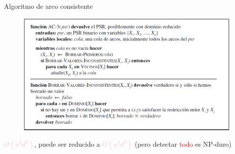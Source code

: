 \begin{frame}{Algoritmo de arco consistente}
    \begin{figure}[t]
        \includegraphics[scale = 0.2]{5_codigopsr.png}
    \end{figure}
\textcolor{pink}{$O(n^2d^3)$}, puede ser reducido a \textcolor{pink}{$O(n^2d^2)$} (pero detectar \textcolor{red}{todo} es NP-duro)
\end{frame}
